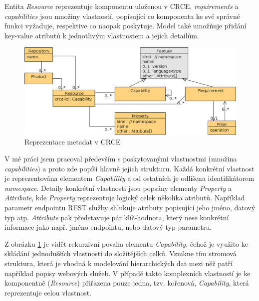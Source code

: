 \documentclass[czech,DP]{thesiskiv}
\begin{document}
Entita \textit{Resource} reprezentuje komponentu uloženou v CRCE, \textit{requirements} a \textit{capabilities} jsou množiny vlastností, popisující co komponenta ke své správné funkci vyžaduje, respektive co naopak poskytuje. Model také umožňuje přidání key-value atributů k jednotlivým vlastnostem a jejich detailům.
 
 \begin{figure}[h]
 	\centering
 	\includegraphics{resource-uml}
 	\caption{Reprezentace metadat v CRCE}
 	\label{fig:crce-resource-uml}
 \end{figure}

V mé práci jsem pracoval především s poskytovanými vlastnostmi (množina \textit{capabilities}) a proto zde popíši hlavně jejich strukturu. Každá konkrétní vlastnost je reprezentována elementem \textit{Capability} a od ostatních je odlišena identifikátorem \textit{namespace}. Detaily konkrétní vlastnosti jsou popsány elementy \textit{Property} a \textit{Attribute}, kde \textit{Property} reprezentuje logický celek několika atributů. Například parametr endpointu REST služby shlukuje atributy popisující jeho jméno, datový typ atp. \textit{Attribute} pak představuje pár klíč-hodnota, který nese konkrétní informace jako např. jméno endpointu, nebo datový typ parametru.

Z obrázku \ref{fig:crce-resource-uml} je vidět rekurzivní povaha elementu \textit{Capability}, čehož je využito ke skládání jednodušších vlastností do složitějších celků. Vznikne tím stromová struktura, která je vhodná k modelování hierarchických dat mezi něž patří například popisy webových služeb. V případě takto komplexních vlastností je ke komponentně (\textit{Resource}) přiřazena pouze jedna, tzv. kořenová, \textit{Capability}, která reprezentuje celou vlastnost.
\end{document}
